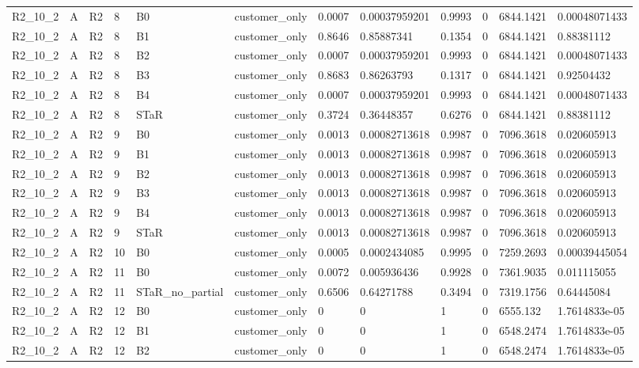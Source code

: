 \begin{longtable}{llllllllllll}
R2\_10\_2 & A & R2 & 8 & B0 & customer\_only & 0.0007 & 0.00037959201 & 0.9993 & 0 & 6844.1421 & 0.00048071433 \\
R2\_10\_2 & A & R2 & 8 & B1 & customer\_only & 0.8646 & 0.85887341 & 0.1354 & 0 & 6844.1421 & 0.88381112 \\
R2\_10\_2 & A & R2 & 8 & B2 & customer\_only & 0.0007 & 0.00037959201 & 0.9993 & 0 & 6844.1421 & 0.00048071433 \\
R2\_10\_2 & A & R2 & 8 & B3 & customer\_only & 0.8683 & 0.86263793 & 0.1317 & 0 & 6844.1421 & 0.92504432 \\
R2\_10\_2 & A & R2 & 8 & B4 & customer\_only & 0.0007 & 0.00037959201 & 0.9993 & 0 & 6844.1421 & 0.00048071433 \\
R2\_10\_2 & A & R2 & 8 & STaR & customer\_only & 0.3724 & 0.36448357 & 0.6276 & 0 & 6844.1421 & 0.88381112 \\
R2\_10\_2 & A & R2 & 9 & B0 & customer\_only & 0.0013 & 0.00082713618 & 0.9987 & 0 & 7096.3618 & 0.020605913 \\
R2\_10\_2 & A & R2 & 9 & B1 & customer\_only & 0.0013 & 0.00082713618 & 0.9987 & 0 & 7096.3618 & 0.020605913 \\
R2\_10\_2 & A & R2 & 9 & B2 & customer\_only & 0.0013 & 0.00082713618 & 0.9987 & 0 & 7096.3618 & 0.020605913 \\
R2\_10\_2 & A & R2 & 9 & B3 & customer\_only & 0.0013 & 0.00082713618 & 0.9987 & 0 & 7096.3618 & 0.020605913 \\
R2\_10\_2 & A & R2 & 9 & B4 & customer\_only & 0.0013 & 0.00082713618 & 0.9987 & 0 & 7096.3618 & 0.020605913 \\
R2\_10\_2 & A & R2 & 9 & STaR & customer\_only & 0.0013 & 0.00082713618 & 0.9987 & 0 & 7096.3618 & 0.020605913 \\
R2\_10\_2 & A & R2 & 10 & B0 & customer\_only & 0.0005 & 0.0002434085 & 0.9995 & 0 & 7259.2693 & 0.00039445054 \\
R2\_10\_2 & A & R2 & 11 & B0 & customer\_only & 0.0072 & 0.005936436 & 0.9928 & 0 & 7361.9035 & 0.011115055 \\
R2\_10\_2 & A & R2 & 11 & STaR\_no\_partial & customer\_only & 0.6506 & 0.64271788 & 0.3494 & 0 & 7319.1756 & 0.64445084 \\
R2\_10\_2 & A & R2 & 12 & B0 & customer\_only & 0 & 0 & 1 & 0 & 6555.132 & 1.7614833e-05 \\
R2\_10\_2 & A & R2 & 12 & B1 & customer\_only & 0 & 0 & 1 & 0 & 6548.2474 & 1.7614833e-05 \\
R2\_10\_2 & A & R2 & 12 & B2 & customer\_only & 0 & 0 & 1 & 0 & 6548.2474 & 1.7614833e-05 \\

\end{longtable}
